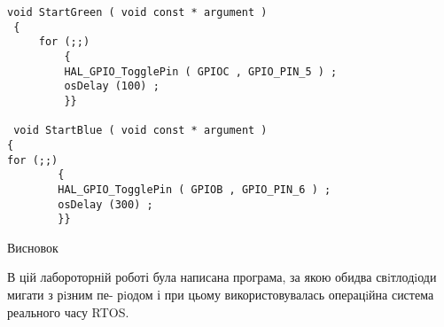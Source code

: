 \documentclass[a4paper,14pt]{extreport}
\begin{document}
\begin{verbatim}
void StartGreen ( void const * argument )
 {
     for (;;)
         {
         HAL_GPIO_TogglePin ( GPIOC , GPIO_PIN_5 ) ;
         osDelay (100) ;
         }}
 
 void StartBlue ( void const * argument )
{
for (;;)
        {
        HAL_GPIO_TogglePin ( GPIOB , GPIO_PIN_6 ) ;
        osDelay (300) ;
        }}
\end{verbatim}

\begin{center}
Висновок 
\end{center}
В цій лабороторній роботі була написана програма, за якою обидва свiтлодiоди  мигати з рiзним пе-
рiодом і при цьому використовувалась операцiйна система реального часу RTOS.
\end{document}
